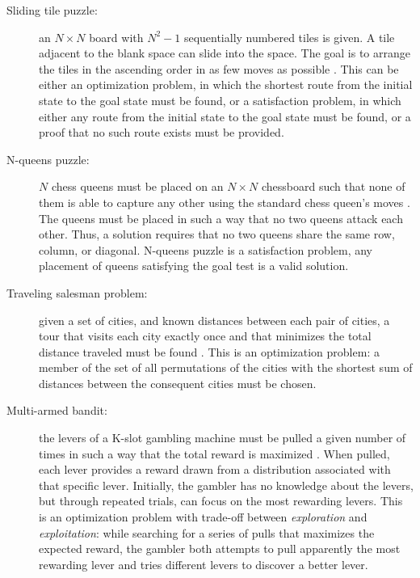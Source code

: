 \begin{description}
\item[Sliding tile puzzle:] an $N\times N$ board with $N^2-1$
  sequentially numbered tiles is given. A tile adjacent to the blank
  space can slide into the space. The goal is to arrange the tiles in
  the ascending order in as few moves as
  possible \cite{Russell.aima}. This can be either an optimization
  problem, in which the shortest route from the initial state to the
  goal state must be found, or a satisfaction problem, in which either
  any route from the initial state to the goal state must be found, or a
  proof that no such route exists must be provided.

\item[N-queens puzzle:] $N$ chess queens must be placed
  on an $N\times N$ chessboard such that none of them is able to
  capture any other using the standard chess queen's
  moves \cite{Russell.aima}. The queens must be placed in such a way
  that no two queens attack each other. Thus, a solution requires that
  no two queens share the same row, column, or diagonal. N-queens
  puzzle is a satisfaction problem, any placement of queens satisfying
  the goal test is a valid solution.

\item[Traveling salesman problem:] given a set of cities, and known
 distances between each pair of cities, a tour that visits each city
 exactly once and that minimizes the total distance traveled must be
 found \cite{Russell.aima}. This is an optimization problem: a member
 of the set of all permutations of the cities with the shortest sum of
 distances between the consequent cities must be chosen.

\item[Multi-armed bandit:] the levers of a K-slot gambling machine must be
 pulled a given number of times in such a way that the total reward 
 is maximized \cite{Vermorel.bandits}. When pulled, each lever provides a
 reward drawn from a distribution associated with that specific
 lever. Initially, the gambler has no knowledge about the levers, but
 through repeated trials, can focus on the most rewarding levers. This
 is an optimization problem with trade-off between {\em exploration}
 and {\em exploitation}: while searching for a series of pulls that maximizes
 the expected reward, the gambler both attempts to pull apparently the most
 rewarding lever and tries different levers to discover
 a better lever.
\end{description}

